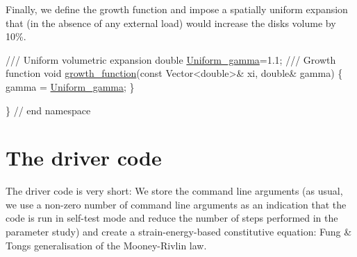 Finally, we define the growth function and impose a spatially uniform expansion that (in the absence of any external load) would increase the disk\textquotesingle{}s volume by 10\%.


\begin{DoxyCodeInclude}

\textcolor{comment}{}
\textcolor{comment}{ /// Uniform volumetric expansion}
\textcolor{comment}{} \textcolor{keywordtype}{double} \hyperlink{namespaceGlobal__Physical__Variables_ae02b5f5b098b05fba75f3b61f381c5f7}{Uniform\_gamma}=1.1;
\textcolor{comment}{}
\textcolor{comment}{ /// Growth function}
\textcolor{comment}{} \textcolor{keywordtype}{void} \hyperlink{namespaceGlobal__Physical__Variables_a6be3760e5494b1772e4bfe5d5f3c5d53}{growth\_function}(\textcolor{keyword}{const} Vector<double>& xi, \textcolor{keywordtype}{double}& gamma)
 \{
  gamma = \hyperlink{namespaceGlobal__Physical__Variables_ae02b5f5b098b05fba75f3b61f381c5f7}{Uniform\_gamma};
 \}
 
\} \textcolor{comment}{// end namespace}

\end{DoxyCodeInclude}




 

\hypertarget{index_main}{}\section{The driver code}\label{index_main}
The driver code is very short\+: We store the command line arguments (as usual, we use a non-\/zero number of command line arguments as an indication that the code is run in self-\/test mode and reduce the number of steps performed in the parameter study) and create a strain-\/energy-\/based constitutive equation\+: Fung \& Tong\textquotesingle{}s generalisation of the Mooney-\/\+Rivlin law.


